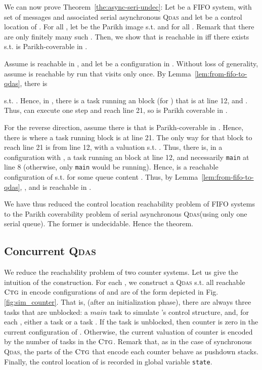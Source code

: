 \documentclass[runningheads,oribibl,]{article}
\newcommand{\main}{\ensuremath{\textit{main}}\xspace}
\newcommand{\qdas}{\textsc{Qdas}\xspace}
\newcommand{\ctg}{\ensuremath{\textsc{Ctg}}\xspace}
\newenvironment{proof}{\noindent{\it Proof.\hspace*{.5cm}}}{}
\newcommand{\qed}{\hfill}
\begin{document}
We can now prove Theorem~\ref{the:async-seri-undec}:
\begin{proof}
  Let  be a FIFO system, with set of messages  and associated
  serial asynchronous \qdas  and let  be a control location
  of . For all , let  be the Parikh image
  s.t.  and  for all . Remark that there are only finitely many
  such . Then, we show that  is reachable in  iff there
  exists  s.t.   is Parikh-coverable in
  .

  Assume  is reachable in , and let  be a configuration
  in . Without loss of generality, assume  is reachable
  by run that visits  only once. By
  Lemma~\ref{lem:from-fifo-to-qdas}, there is
  
  s.t. . Hence, in , there is
  a task running an  block (for ) that is at line
  12, and . Thus,  can execute one step
  and reach line 21, so  is Parikh coverable in .

  For the reverse direction, assume there is  that
  is Parikh-coverable in . Hence, there is
   where a task running block  is
  at line 21. The only way for that block to reach line 21 is from
  line 12, with a valuation 
  s.t. . Thus, there is, in 
  a configuration  with ,
  a task running an  block at line 12, and necessarily
  \texttt{main} at line 8 (otherwise, only \texttt{main} would be
  running). Hence,  is a reachable configuration of
   s.t.  for some queue content
  . Thus, by Lemma~\ref{lem:from-fifo-to-qdas},
  , and  is reachable in .

  We have thus reduced the control location reachability problem of
  FIFO systems to the Parikh coverability problem of serial
  asynchronous \qdas (using only one serial queue). The former is
  undecidable. Hence the theorem.\qed
\end{proof}


\subsection{Concurrent \qdas}

We reduce the reachability problem of two counter
systems. Let us give the intuition of the construction. For each
, we construct a \qdas  s.t. all reachable \ctg in
 encode configurations of  and are of the form depicted
in Fig.\,\ref{fig:sim_counter}. That is, (after an initialization
phase), there are always three tasks that are unblocked: a \main task
to simulate 's control structure, and, for each ,
either a task  or a task . If the task  is
unblocked, then counter  is zero in the current configuration of
. Otherwise, the current valuation of counter  is encoded by
the number of  tasks in the \ctg. Remark that, as in the case
of synchronous \qdas, the parts of the \ctg that encode each counter
behave as pushdown stacks. Finally, the control location of  is recorded in
global variable \texttt{state}.
\end{document}

